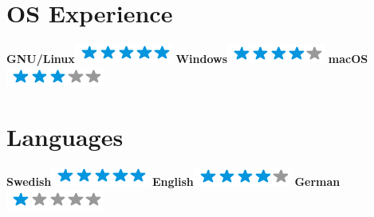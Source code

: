 \documentclass[]{friggeri-cv}
\begin{document}
\begin{aside}
  \section{OS Experience}
    \textbf{GNU/Linux}\includegraphics[scale=0.40]{img/5stars.png}
    \textbf{Windows}\includegraphics[scale=0.40]{img/4stars.png}
    \textbf{macOS}\includegraphics[scale=0.40]{img/3stars.png}
    ~
  \section{Languages}
    \textbf{Swedish}\includegraphics[scale=0.40]{img/5stars.png}
    \textbf{English}\includegraphics[scale=0.40]{img/4stars.png}
    \textbf{German}\includegraphics[scale=0.40]{img/1stars.png}
\end{aside}
\end{document}
